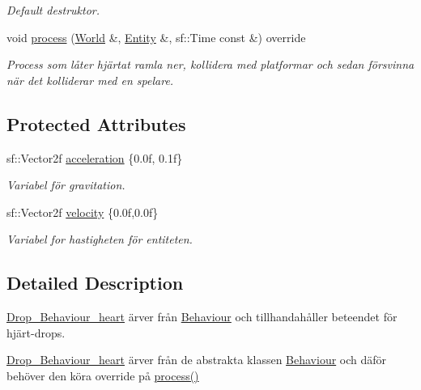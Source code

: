 \begin{DoxyCompactItemize}
\begin{DoxyCompactList}\small\item\em Default destruktor. \end{DoxyCompactList}\item 
void \hyperlink{classDrop__Behaviour__heart_a38a5d26b313a84e4428093d537a446fb}{process} (\hyperlink{classWorld}{World} \&, \hyperlink{classEntity}{Entity} \&, sf\+::\+Time const \&) override
\begin{DoxyCompactList}\small\item\em Process som låter hjärtat ramla ner, kollidera med platformar och sedan försvinna när det kolliderar med en spelare. \end{DoxyCompactList}\end{DoxyCompactItemize}
\subsection*{Protected Attributes}
\begin{DoxyCompactItemize}
\item 
sf\+::\+Vector2f \hyperlink{classBehaviour_ac17cf81ceee6a44e8a8ec6ee810c9fd3}{acceleration} \{0.\+0f, 0.\+1f\}
\begin{DoxyCompactList}\small\item\em Variabel för gravitation. \end{DoxyCompactList}\item 
sf\+::\+Vector2f \hyperlink{classBehaviour_a1d52096cf20a59890f7705acbaccf88a}{velocity} \{0.\+0f,0.\+0f\}
\begin{DoxyCompactList}\small\item\em Variabel for hastigheten för entiteten. \end{DoxyCompactList}\end{DoxyCompactItemize}


\subsection{Detailed Description}
\hyperlink{classDrop__Behaviour__heart}{Drop\+\_\+\+Behaviour\+\_\+heart} ärver från \hyperlink{classBehaviour}{Behaviour} och tillhandahåller beteendet för hjärt-\/drops. 

\hyperlink{classDrop__Behaviour__heart}{Drop\+\_\+\+Behaviour\+\_\+heart} ärver från de abstrakta klassen \hyperlink{classBehaviour}{Behaviour} och däför behöver den köra override på \hyperlink{classDrop__Behaviour__heart_a38a5d26b313a84e4428093d537a446fb}{process()} 

